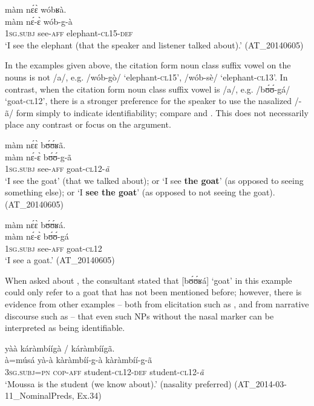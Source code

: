 \documentclass[output=paper]{langsci/langscibook}
\begin{document}
\ea\label{ex:teo:47}
\glll màm  n\'ɛ\`ɛ wóbʁà.\\
 màm n\'ɛ-\`ɛ wób-g-à\\
1\textsc{sg.subj} see-\textsc{aff} elephant-\textsc{cl15-def}\\
\glt ‘I see the elephant (that the speaker and listener talked about).’ (AT\_20140605)
\z

In the examples given above, the citation form noun class suffix vowel on the nouns is not /a/, e.g. /wób-gò/ ‘elephant-\textsc{cl15}’, /wób-sè/ ‘elephant-\textsc{cl13}’. In contrast, when the citation form noun class suffix vowel is /a/, e.g. /b\'ʊ\'ʊ-gá/ ‘goat-\textsc{cl12}’, there is a stronger preference for the speaker to use the nasalized /-ã/ form simply to indicate identifiability; compare  and . This does not necessarily place any contrast or focus on the argument.


\ea\label{ex:teo:48}
\glll màm  n\'ɛ\`ɛ b\'ʊ\'ʊʁã.\\
màm n\'ɛ-\`ɛ b\'ʊ\'ʊ-g-ã\\
\textsc{1sg.subj} see-\textsc{aff} goat-\textsc{cl12}-\textit{ã}\\
\glt ‘I see the goat’ (that we talked about); or ‘I see \textbf{the goat}’ (as opposed to seeing something else); or ‘I \textbf{see the goat}’ (as opposed to not seeing the goat). (AT\_20140605)
\z

\ea\label{ex:teo:49}
\glll màm n\'ɛ\`ɛ b\'ʊ\'ʊʁá.\\
màm n\'ɛ-\`ɛ b\'ʊ\'ʊ-gá\\
\textsc{1sg.subj} see-\textsc{aff} goat-\textsc{cl12}\\
\glt ‘I see a goat.’ (AT\_20140605)
\z

When asked about , the consultant stated that [b\'ʊ\'ʊʁá] ‘goat’ in this example could only refer to a goat that has not been mentioned before; however, there is evidence from other examples – both from elicitation such as , and from narrative discourse such as  – that even such NPs without the nasal marker can be interpreted as being identifiable.

\ea\label{ex:teo:50}
 yàà {káràmbíígà /} {káràmbíígã}. \\
à=músá yà-à kàràmbíí-g-à kàràmbíí-g-ã\\
\textsc{3sg.subj=pn} \textsc{cop-aff} student-\textsc{cl12-def} student-\textsc{cl12}-\textit{ã}\\
\glt ‘Moussa is the student (we know about).’ (nasality preferred) (AT\_2014-03-11\_NominalPreds, Ex.34)
\z
\end{document}
